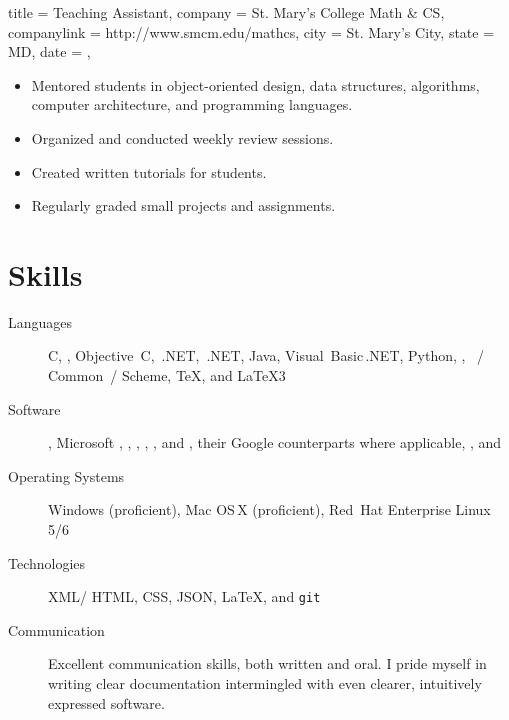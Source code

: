 \documentclass[
textout=\jobname.cv.txt,
textout preamble = preamble.txt,
]{bettercv}
\begin{document}
\begin{position}
  {
    title   = Teaching Assistant,
    company = St. Mary's College \Dash Math \& CS,
    companylink = http://www.smcm.edu/mathcs,
    city    = St. Mary's City,
    state   = MD,
    date    = ,
  }

\begin{itemize}
\item Mentored students in object-oriented design, data structures, algorithms, computer architecture, and programming languages.
\item Organized and conducted weekly review sessions.
\item Created written tutorials for students.
\item Regularly graded small projects and assignments.
\end{itemize}
\end{position}

\section{Skills}

\begin{description}
\item[Languages]
  C,
  \CPP,
  Objective~C,
  \CPP\,.NET,
  \CSharp\,.NET,
  Java,
  Visual~Basic\,.NET,
  Python,
  ,
  ~\Lisp\slash
            Common~\Lisp\slash
            Scheme,
  \TeX,
  and \LaTeX3

\item[Software]
  ,
  Microsoft ,
            ,
            ,
            ,
            ,
            and ,
  their Google counterparts where applicable,
  ,
  and 

\item[Operating Systems]
  Windows (proficient),
  Mac OS\,X (proficient),
  Red~Hat Enterprise Linux 5\slash 6

\item[Technologies]
  XML\slash
  HTML,
  CSS,
  JSON,
  \LaTeX,
  and \texttt{git}

\item[Communication]
  Excellent communication skills, both written and oral.
  I pride myself in writing clear documentation intermingled with
    even clearer, intuitively expressed software.
\end{description}
\end{document}
